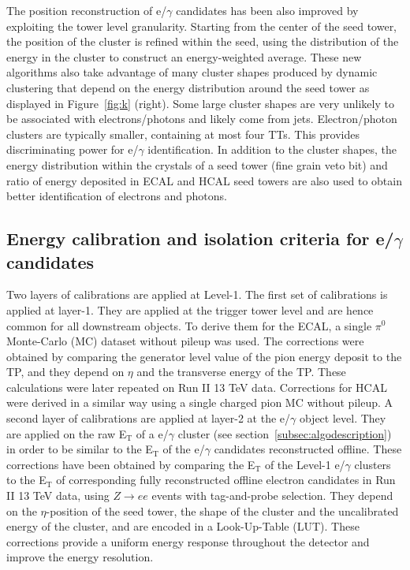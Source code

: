 \documentclass[a4paper,11pt]{article}
\begin{document}
The position reconstruction of e/$\gamma$ candidates has been also improved by exploiting the tower level granularity. Starting from the center of the seed tower, the position of the cluster is refined within the seed, using the distribution of the energy in the cluster to construct an energy-weighted average. These new algorithms also take advantage of many cluster shapes produced by dynamic clustering that depend on the energy distribution around the seed tower as displayed in Figure~\ref{fig:k} (right). Some large cluster shapes are very unlikely to be associated with electrons/photons and likely come from jets. Electron/photon clusters are typically smaller, containing at most four TTs. This provides discriminating power for e/$\gamma$ identification. In addition to the cluster shapes, the energy distribution within the crystals of a seed tower (fine grain veto bit) and ratio of energy deposited in ECAL and HCAL seed towers are also used to obtain better identification of electrons and photons.


\subsection{Energy calibration and isolation criteria for e/$\gamma$ candidates}  

Two layers of calibrations are applied at Level-1. The first set of calibrations is applied at layer-1. They are applied at the trigger tower level and are hence common for all downstream objects.  To derive them for the ECAL, a single $\pi^{0}$ Monte-Carlo (MC) dataset without pileup was used. The corrections were obtained by comparing the generator level value of the pion energy deposit to the TP, and they depend on $\eta$ and the transverse energy of the TP. These calculations were later repeated on Run II 13 TeV data. Corrections for HCAL were derived in a similar way using a single charged pion MC without pileup. A second layer of calibrations are applied at layer-2 at the e/$\gamma$ object level. They are applied on the raw E$_\text{T}$ of a e/$\gamma$ cluster (see section~\ref{subsec:algodescription}) in order to be similar to the E$_\text{T}$  of the e/$\gamma$ candidates reconstructed offline. These corrections have been obtained by comparing the E$_\text{T}$ of the Level-1 e/$\gamma$ clusters to the E$_\text{T}$ of corresponding fully reconstructed offline electron candidates in Run II 13 TeV data, using $Z\rightarrow ee$ events with tag-and-probe selection. They depend on the $\eta$-position of the seed tower, the shape of the cluster and the uncalibrated energy of the cluster, and are encoded in a Look-Up-Table (LUT). These corrections provide a uniform energy response throughout the detector and improve the energy resolution.
\end{document}
